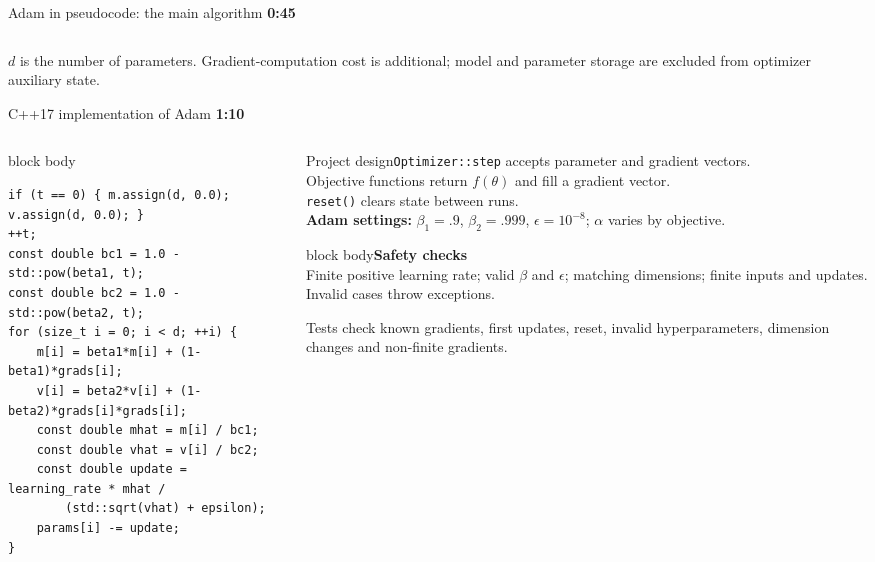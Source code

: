 \documentclass[aspectratio=169,10pt]{beamer}
\newcommand{\timing}[1]{\hfill{\color{teal}\scriptsize\bfseries #1}}
\begin{document}
\begin{frame}{Adam in pseudocode: the main algorithm \timing{0:45}}
\begin{columns}[T,onlytextwidth]
\begin{column}{.33\textwidth}
\end{column}
\end{columns}
\vspace{.05cm}\centering\tiny $d$ is the number of parameters. Gradient-computation cost is additional; model and parameter storage are excluded from optimizer auxiliary state.
\end{frame}

\begin{frame}[fragile]{C++17 implementation of Adam \timing{1:10}}
\begin{columns}[T,onlytextwidth]\begin{column}{.58\textwidth}\begin{beamercolorbox}[rounded=true,sep=.4em,wd=\linewidth]{block body}\begin{lstlisting}
if (t == 0) { m.assign(d, 0.0); v.assign(d, 0.0); }
++t;
const double bc1 = 1.0 - std::pow(beta1, t);
const double bc2 = 1.0 - std::pow(beta2, t);
for (size_t i = 0; i < d; ++i) {
    m[i] = beta1*m[i] + (1-beta1)*grads[i];
    v[i] = beta2*v[i] + (1-beta2)*grads[i]*grads[i];
    const double mhat = m[i] / bc1;
    const double vhat = v[i] / bc2;
    const double update = learning_rate * mhat /
        (std::sqrt(vhat) + epsilon);
    params[i] -= update;
}
\end{lstlisting}
\end{beamercolorbox}\end{column}
\begin{column}{.39\textwidth}\begin{block}{Project design}\small \texttt{Optimizer::step} accepts parameter and gradient vectors.\\[.3em]Objective functions return $f(\theta)$ and fill a gradient vector.\\[.3em]\texttt{reset()} clears state between runs.\\[.3em]\textbf{Adam settings:} $\beta_1=.9$, $\beta_2=.999$, $\epsilon=10^{-8}$; $\alpha$ varies by objective.\end{block}\begin{beamercolorbox}[rounded=true,sep=.5em,wd=\linewidth]{block body}\textbf{Safety checks}\\[-.1em]\scriptsize Finite positive learning rate; valid $\beta$ and $\epsilon$; matching dimensions; finite inputs and updates. Invalid cases throw exceptions.\end{beamercolorbox}\vspace{.25em}\scriptsize Tests check known gradients, first updates, reset, invalid hyperparameters, dimension changes and non-finite gradients.\end{column}\end{columns}

\end{frame}
\end{document}

